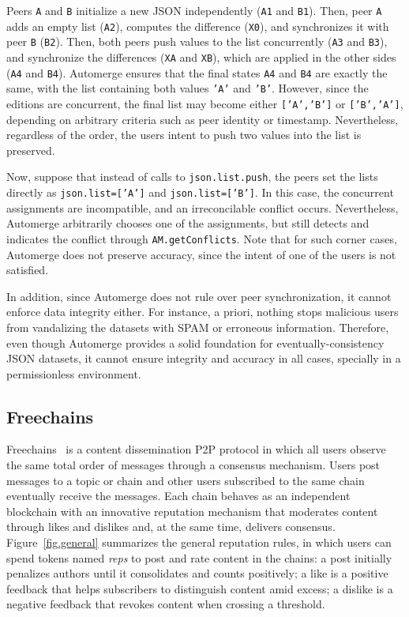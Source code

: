 \documentclass[12pt]{article}
\newcommand{\code}[1]  {\texttt{\footnotesize{#1}}}
\begin{document}
Peers \code{A} and \code{B} initialize a new JSON independently (\code{A1} and
\code{B1}).
Then, peer \code{A} adds an empty list (\code{A2}), computes the difference
(\code{X0}), and synchronizes it with peer \code{B} (\code{B2}).
Then, both peers push values to the list concurrently (\code{A3} and
\code{B3}), and synchronize the differences (\code{XA} and \code{XB}), which
are applied in the other sides (\code{A4} and \code{B4}).
Automerge ensures that the final states \code{A4} and \code{B4} are exactly the
same, with the list containing both values \code{'A'} and \code{'B'}.
However, since the editions are concurrent, the final list may become either
\code{['A','B']} or \code{['B','A']}, depending on arbitrary criteria such as
peer identity or timestamp.
Nevertheless, regardless of the order, the users intent to push two values into
the list is preserved.

Now, suppose that instead of calls to \code{json.list.push}, the peers set the
lists directly as \code{json.list=['A']} and \code{json.list=['B']}.
In this case, the concurrent assignments are incompatible, and an
irreconcilable conflict occurs.
Nevertheless, Automerge arbitrarily chooses one of the assignments, but still
detects and indicates the conflict through \code{AM.getConflicts}.
Note that for such corner cases, Automerge does not preserve accuracy, since
the intent of one of the users is not satisfied.

In addition, since Automerge does not rule over peer synchronization, it cannot
enforce data integrity either.
For instance, a priori, nothing stops malicious users from vandalizing the
datasets with SPAM or erroneous information.
%
Therefore, even though Automerge provides a solid foundation for
eventually-consistency JSON datasets, it cannot ensure integrity and accuracy
in all cases, specially in a permissionless environment.

\subsection{Freechains}
\label{sec.both.freechains}

Freechains~\cite{fcs.sbseg20} is a content dissemination P2P protocol in which
all users observe the same total order of messages through a consensus
mechanism.
%
Users post messages to a topic or chain and other users subscribed to the same
chain eventually receive the messages.
%
Each chain behaves as an independent blockchain with an innovative reputation
mechanism that moderates content through likes and dislikes and, at the same
time, delivers consensus.
%
Figure~\ref{fig.general} summarizes the general reputation rules, in which
users can spend tokens named \emph{reps} to post and rate content in the
chains:
    a post initially penalizes authors until it consolidates and counts positively;
    a like is a positive feedback that helps subscribers to distinguish content amid excess;
    a dislike is a negative feedback that revokes content when crossing a threshold.
\end{document}
